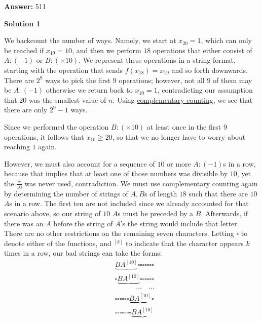 \begin{enumerate}
 
 \textbf{Answer: }511



\textbf{Solution 1}

We backcount the number of ways. Namely, we start at $x_{20} = 1$, which can only be reached if $x_{19} = 10$, and then we perform $18$ operations that either consist of $A: (-1)$ or $B: (\times 10)$. We represent these operations in a string format, starting with the operation that sends $f(x_{18}) = x_{19}$ and so forth downwards. There are $2^9$ ways to pick the first $9$ operations; however, not all $9$ of them may be $A: (-1)$ otherwise we return back to $x_{10} = 1$, contradicting our assumption that $20$ was the smallest value of $n$. Using \href{https://artofproblemsolving.com/wiki/index.php?title=Complementary\_counting}{complementary counting}, we see that there are only $2^9 - 1$ ways.

 Since we performed the operation $B: (\times 10)$ at least once in the first $9$ operations, it follows that $x_{10} \ge 20$, so that we no longer have to worry about reaching $1$ again. 

 However, we must also account for a sequence of $10$ or more $A: (-1)$s in a row, because that implies that at least one of those numbers was divisible by $10$, yet the $\frac{x}{10}$ was never used, contradiction. We must use complementary counting again by determining the number of strings of $A,B$s of length $18$ such that there are $10$ $A$s in a row. The first ten are not included since we already accounted for that scenario above, so our string of $10$ $A$s must be preceded by a $B$. Afterwards, if there was an $A$ before the string of $A$'s the string would include that letter. There are no other restrictions on the remaining seven characters. Letting $\square$ to denote either of the functions, and $^{[k]}$ to indicate that the character appears $k$ times in a row, our bad strings can take the forms:
 \begin{align*} &\underbrace{BA^{[10]}}\square \square \square \square \square \square \square\\ &\square \underbrace{BA^{[10]}}\square \square \square \square \square \square \\ &\qquad \quad \cdots \quad \cdots \\ &\square \square \square \square \square \square \underbrace{BA^{[10]}} \square \\ &\square \square \square \square \square \square \square \underbrace{BA^{[10]}} \\ \end{align*}



\end{enumerate}
